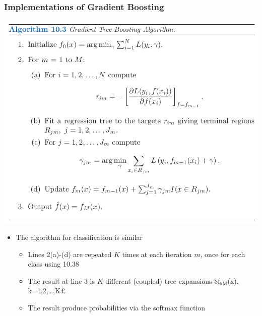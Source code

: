 \documentclass[11pt]{article}
\begin{document}
\subsubsection{Implementations of Gradient Boosting}
\label{sec:orgfc55a89}
\begin{center}
\includegraphics[width=.9\linewidth]{Boosting and Additive Trees/screenshot_2018-10-22_21-27-02.png}
\end{center}
\begin{itemize}
\item The algorithm for classification is similar
\begin{itemize}
\item Lines 2(a)-(d) are repeated \(K\) times at each iteration \(m\), once for each class using 10.38
\item The result at line 3 is \(K\) different (coupled) tree expansions \$f\(_{\text{kM}}\)(x), k=1,2,\dots{},K£
\item The result produce probabilities via the softmax function
\end{itemize}
\end{itemize}
\end{document}
